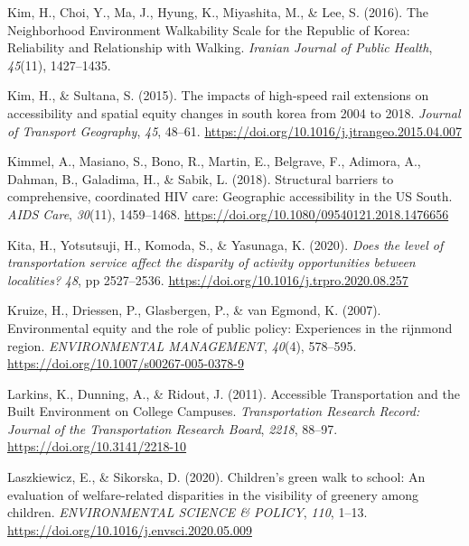 \documentclass[
  letterpaper,
  DIV=11,
  numbers=noendperiod]{scrartcl}
\newlength{\cslhangindent}
\newenvironment{CSLReferences}[2] %
 {\begin{list}{}{%
  \setlength{\itemindent}{0pt}
  \setlength{\leftmargin}{0pt}
  \setlength{\parsep}{0pt}
  \ifodd #1
   \setlength{\leftmargin}{\cslhangindent}
   \setlength{\itemindent}{-1\cslhangindent}
  \fi
  \setlength{\itemsep}{#2\baselineskip}}}
 {\end{list}}
\begin{document}
\begin{CSLReferences}{1}{0}
Kim, H., Choi, Y., Ma, J., Hyung, K., Miyashita, M., \& Lee, S. (2016).
The {Neighborhood Environment Walkability Scale} for the {Republic} of
{Korea}: {Reliability} and {Relationship} with {Walking}. \emph{Iranian
Journal of Public Health}, \emph{45}(11), 1427--1435.

Kim, H., \& Sultana, S. (2015). The impacts of high-speed rail
extensions on accessibility and spatial equity changes in south korea
from 2004 to 2018. \emph{Journal of Transport Geography}, \emph{45},
48--61. \url{https://doi.org/10.1016/j.jtrangeo.2015.04.007}

Kimmel, A., Masiano, S., Bono, R., Martin, E., Belgrave, F., Adimora,
A., Dahman, B., Galadima, H., \& Sabik, L. (2018). Structural barriers
to comprehensive, coordinated {HIV} care: Geographic accessibility in
the {US South}. \emph{AIDS Care}, \emph{30}(11), 1459--1468.
\url{https://doi.org/10.1080/09540121.2018.1476656}

Kita, H., Yotsutsuji, H., Komoda, S., \& Yasunaga, K. (2020). \emph{Does
the level of transportation service affect the disparity of activity
opportunities between localities?} \emph{48}, pp 2527--2536.
\url{https://doi.org/10.1016/j.trpro.2020.08.257}

Kruize, H., Driessen, P., Glasbergen, P., \& van Egmond, K. (2007).
Environmental equity and the role of public policy: {Experiences} in the
rijnmond region. \emph{ENVIRONMENTAL MANAGEMENT}, \emph{40}(4),
578--595. \url{https://doi.org/10.1007/s00267-005-0378-9}

Larkins, K., Dunning, A., \& Ridout, J. (2011). Accessible
{Transportation} and the {Built Environment} on {College Campuses}.
\emph{Transportation Research Record: Journal of the Transportation
Research Board}, \emph{2218}, 88--97.
\url{https://doi.org/10.3141/2218-10}

Laszkiewicz, E., \& Sikorska, D. (2020). Children's green walk to
school: {An} evaluation of welfare-related disparities in the visibility
of greenery among children. \emph{ENVIRONMENTAL SCIENCE \& POLICY},
\emph{110}, 1--13. \url{https://doi.org/10.1016/j.envsci.2020.05.009}


\end{CSLReferences}
\end{document}
